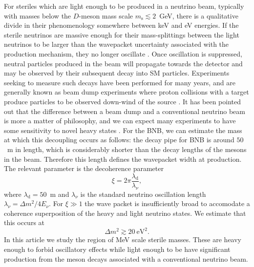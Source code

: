 \documentclass[11pt, a4paper]{article}
\begin{document}
For steriles which are light enough to be produced in a neutrino beam,
typically with masses below the $D$-meson mass scale $m_\text{s} \lesssim
2$~GeV, there is a qualitative divide in their phenomenology somewhere between
keV and eV energies. If the sterile neutrinos are massive enough for their
mass-splittings between the light neutrinos to be larger than the wavepacket
uncertainty associated with the production mechanism, they no longer oscillate
\cite{Akhmedov:2009rb}.  
%
Once oscillation is suppressed, neutral particles produced in the beam will
propagate towards the detector and may be observed by their subsequent decay
into SM particles. Experiments seeking to measure such decays have been
performed for many years, and are generally known as beam dump experiments
where proton collisions with a target produce particles to be observed
down-wind of the source \cite{CooperSarkar:1985nh, Bergsma:1985is,
Vaitaitis:1999wq, Bernardi:1985ny, Bernardi:1987ek, Anelli:2015pba,
Alekhin:2015byh}. It has been pointed out that the difference between a beam
dump and a conventional neutrino beam is more a matter of philosophy, and we
can expect many experiments to have some sensitivity to novel heavy states
\cite{Gorbunov:2007ak, Asaka:2012bb, Adams:2013qkq}. 
%
For the BNB, we can estimate the mass at which this decoupling occurs as
follows: the decay pipe for BNB is around $50$~m in length, which is
considerably shorter than the decay lengths of the mesons in the beam.
Therefore this length defines the wavepacket width at production.  The relevant
parameter is the decoherence parameter \cite{Akhmedov:2009rb, Hernandez:2011rs}
%
\[  \xi = 2\pi \frac{\lambda_\text{d}}{\lambda_\nu}, \]
%
where $\lambda_\text{d} = 50$~m and $\lambda_\nu$ is the standard neutrino
oscillation length $\lambda_\nu = \Delta m^2/4E_\nu$. For $\xi\gg1$ the wave
packet is insufficiently broad to accomodate a coherence superposition of the
heavy and light neutrino states. We estimate that this occurs at 
%
\[  \Delta m^2 \gtrsim 20~\text{eV}^2. \] 
%
In this article we study the region of MeV scale sterile masses. These are
heavy enough to forbid oscillatory effects while light enough to be have
significant production from the meson decays associated with a conventional
neutrino beam. 
\end{document}
